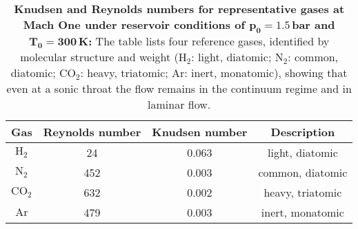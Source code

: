 \begin{table}[ht]
  \centering
  \renewcommand{\arraystretch}{1.4} %
  \begin{tabular}{|c||c|c||c|}
    \hline
    Gas & Reynolds number & Knudsen number & Description \\ \hline \hline
    $\text{H}_2$ & 24 & 0.063 & light, diatomic \\ \hline
    $\text{N}_2$ & 452 & 0.003 & common, diatomic \\ \hline
    $\text{CO}_2$ & 632 & 0.002 & heavy, triatomic \\ \hline
    $\text{Ar}$ & 479 & 0.003 & inert, monatomic \\ \hline
  \end{tabular}
  \caption[Knudsen and Reynolds numbers for representative gases at Mach One under reservoir conditions of $p_0=1.5$\,bar and $T_0=300$\,K:]{%
    \textbf{Knudsen and Reynolds numbers for representative gases at Mach One under reservoir conditions of $\bm{p_0=1.5}$\,bar and $\bm{T_0=300}$\,K:}
    The table lists four reference gases, identified by molecular structure and weight
    (H$_2$: light, diatomic; N$_2$: common, diatomic; CO$_2$: heavy, triatomic; Ar: inert, monatomic),
    showing that even at a sonic throat the flow remains in the continuum regime and in laminar flow.
  }
  \label{tab:knudsen_reynolds_discussion}
\end{table}
